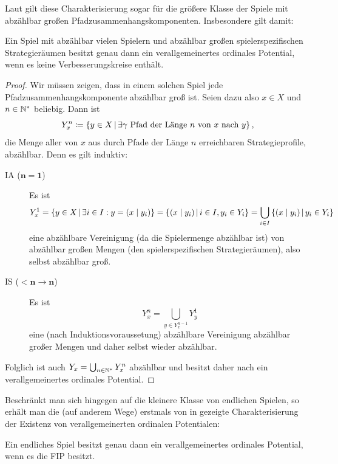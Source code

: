 Laut  gilt diese Charakterisierung sogar für die größere Klasse der Spiele mit abzählbar großen Pfadzusammenhangskomponenten. Insbesondere gilt damit:

\begin{kor}\label{kor:CharExVerOrdPotabzIundXi}
	Ein Spiel mit abzählbar vielen Spielern und abzählbar großen spielerspezifischen Strategieräumen besitzt genau dann ein verallgemeinertes ordinales Potential, wenn es keine Verbesserungskreise enthält.
\end{kor}

\begin{proof}
	Wir müssen zeigen, dass in einem solchen Spiel jede Pfadzusammenhangskomponente abzählbar groß ist. Seien dazu also $x \in X$ und $n \in \mathbb{N}^\ast$ beliebig. Dann ist
		\[Y_x^n \coloneqq \left\{y \in X \,\middle|\, \exists \gamma \text{ Pfad der Länge $n$ von $x$ nach $y$}\right\}, \]
	die Menge aller von $x$ aus durch Pfade der Länge $n$ erreichbaren Strategieprofile, abzählbar. Denn es gilt induktiv:
	\begin{description}
		\item[IA ($\bm{n=1}$)] Es ist
			\[Y_x^1 = \left\{y \in X \,\middle|\, \exists i \in I: y = (x \mid y_i)\right\} = \left\{(x \mid y_i) \,\middle|\, i \in I, y_i \in Y_i \right\} = \bigcup_{i \in I} \left\{(x \mid y_i) \,\middle|\, y_i \in Y_i \right\}\]
			eine abzählbare Vereinigung (da die Spielermenge abzählbar ist) von abzählbar großen Mengen (den spielerspezifischen Strategieräumen), also selbst abzählbar groß.
		\item[IS ($\bm{<n \to n}$)] Es ist
			\[Y_x^n = \bigcup_{y \in Y_x^{n-1}} Y_y^1\]
			eine (nach Induktionsvoraussetung) abzählbare Vereinigung abzählbar großer Mengen und daher selbst wieder abzählbar.
	\end{description}
	Folglich ist auch $Y_x = \bigcup_{n\in\mathbb{N}^\ast} Y_x^n$ abzählbar und besitzt daher nach  ein verallgemeinertes ordinales Potential.
\end{proof}

Beschränkt man sich hingegen auf die kleinere Klasse von endlichen Spielen, so erhält man die (auf anderem Wege) erstmals von \citeauthor{MonShap} in \cite[Lemma 2.5]{MonShap} gezeigte Charakterisierung der Existenz von verallgemeinerten ordinalen Potentialen:

\begin{kor}\label{kor:CharExVerOrdFIP}
	Ein endliches Spiel besitzt genau dann ein verallgemeinertes ordinales Potential, wenn es die FIP besitzt.
\end{kor}

